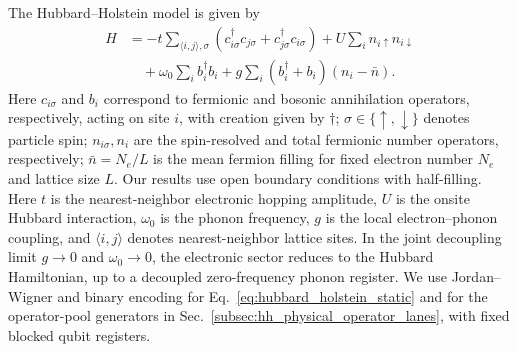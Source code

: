 \documentclass[
  reprint,
  amsmath,
  amssymb,
  aps,
  pra,
  nofootinbib,
  superscriptaddress,
  floatfix
]{revtex4-2}
\begin{document}
The Hubbard--Holstein model is given by
\begin{align}
H
&=-t\sum_{\langle i,j\rangle,\sigma}
(c_{i\sigma}^{\dagger}c_{j\sigma}+c_{j\sigma}^{\dagger}c_{i\sigma})
+U\sum_i n_{i\uparrow}n_{i\downarrow}
\nonumber\\
&\quad+\omega_0\sum_i b_i^\dagger b_i
+g\sum_i(b_i^\dagger+b_i)(n_i-\bar n).
\label{eq:hubbard_holstein_static}
\end{align}
Here \(c_{i\sigma}\) and \(b_i\) correspond to fermionic and bosonic annihilation operators, respectively, acting on site $i$, with creation given by $\dagger$; $\sigma \in\{\uparrow, \downarrow\}$ denotes particle spin;
\(n_{i\sigma}, n_i\) are the spin-resolved and total fermionic number operators, respectively; \(\bar n=N_e/L\) is the mean fermion filling
for fixed electron number \(N_e\) and lattice size \(L\). Our results use open boundary conditions with half-filling.
Here \(t\) is the nearest-neighbor electronic hopping amplitude, \(U\) is the onsite Hubbard interaction, \(\omega_0\) is the phonon frequency, \(g\) is the local electron--phonon coupling, and \(\langle i,j\rangle\) denotes nearest-neighbor lattice sites.
In the joint decoupling limit $g\to0$ and $\omega_0\to0$, the electronic sector reduces to the Hubbard Hamiltonian, up to a decoupled zero-frequency phonon register. We use Jordan--Wigner and binary encoding for Eq.~\eqref{eq:hubbard_holstein_static} and for the operator-pool generators in Sec.~\ref{subsec:hh_physical_operator_lanes}, with fixed blocked qubit registers.
\end{document}
